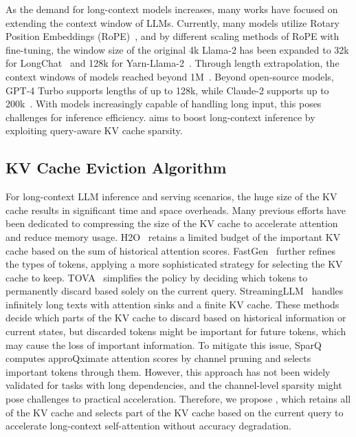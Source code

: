 As the demand for long-context models increases, many works have focused on extending the context window of LLMs. Currently, many models utilize Rotary Position Embeddings (RoPE)~\cite{su2023roformer}, and by different scaling methods of RoPE with fine-tuning, the window size of the original 4k Llama-2 has been expanded to 32k for LongChat~\cite{longchat2023} and 128k for Yarn-Llama-2~\cite{peng2023yarn}. Through length extrapolation, the context windows of models reached beyond 1M~\cite{liu2024scaling}.  Beyond open-source models, GPT-4 Turbo supports lengths of up to 128k, while Claude-2 supports up to 200k~\cite{gpt4,claude}. With models increasingly capable of handling long input, this poses challenges for inference efficiency. \method aims to boost long-context inference by exploiting query-aware KV cache sparsity.

\subsection{KV Cache Eviction Algorithm}

For long-context LLM inference and serving scenarios, the huge size of the KV cache results in significant time and space overheads. Many previous efforts have been dedicated to compressing the size of the KV cache to accelerate attention and reduce memory usage. H2O~\cite{zhang2023h2o} retains a limited budget of the important KV cache based on the sum of historical attention scores. FastGen~\cite{ge2024model} further refines the types of tokens, applying a more sophisticated strategy for selecting the KV cache to keep. TOVA~\cite{oren2024transformers} simplifies the policy by deciding which tokens to permanently discard based solely on the current query. StreamingLLM~\cite{xiao2023streamingllm} handles infinitely long texts with attention sinks and a finite KV cache. These methods decide which parts of the KV cache to discard based on historical information or current states, but discarded tokens might be important for future tokens, which may cause the loss of important information. To mitigate this issue, SparQ~\cite{ribar2023sparq} computes approQximate attention scores by channel pruning and selects important tokens through them. However, this approach has not been widely validated for tasks with long dependencies, and the channel-level sparsity might pose challenges to practical acceleration.
Therefore, we propose \method, which retains all of the KV cache and selects part of the KV cache based on the current query to accelerate long-context self-attention without accuracy degradation. 
